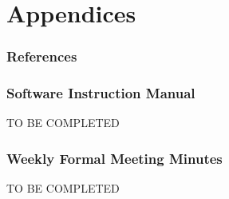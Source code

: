 \documentclass[10pt,a4paper]{article}
\begin{document}
\pagebreak
\part{Appendices}
\section{References}



\section{Software Instruction Manual}
TO BE COMPLETED
\section{Weekly Formal Meeting Minutes}
TO BE COMPLETED
\end{document}
